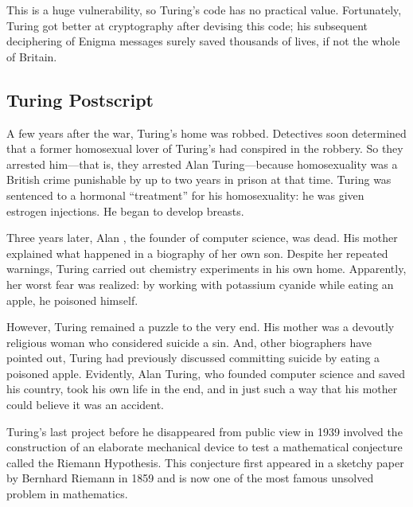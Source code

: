 This is a huge vulnerability, so Turing's code has no practical value.
Fortunately, Turing got better at cryptography after devising this
code; his subsequent deciphering of Enigma messages surely saved
thousands of lives, if not the whole of Britain.


\subsection{Turing Postscript}

A few years after the war, Turing's home was robbed.  Detectives soon
determined that a former homosexual lover of Turing's had conspired in
the robbery.  So they arrested him---that is, they arrested Alan
Turing---because homosexuality was a British crime punishable by up
to two years in prison at that time.  Turing was sentenced to a
hormonal ``treatment'' for his homosexuality: he was given estrogen
injections.  He began to develop breasts.

Three years later, Alan , the founder of computer science, was
dead.  His mother explained what happened in a biography of her own
son.  Despite her repeated warnings, Turing carried out chemistry
experiments in his own home.  Apparently, her worst fear was realized:
by working with potassium cyanide while eating an apple, he poisoned
himself.

However, Turing remained a puzzle to the very end.  His mother was a
devoutly religious woman who considered suicide a sin.  And, other
biographers have pointed out, Turing had previously discussed
committing suicide by eating a poisoned apple.  Evidently, Alan
Turing, who founded computer science and saved his country, took his
own life in the end, and in just such a way that his mother could
believe it was an accident.

Turing's last project before he disappeared from public view in 1939
involved the construction of an elaborate mechanical device to test a
mathematical conjecture called the Riemann Hypothesis.  This conjecture
first appeared in a sketchy paper by Bernhard Riemann in 1859 and is now
one of the most famous unsolved problem in mathematics.

